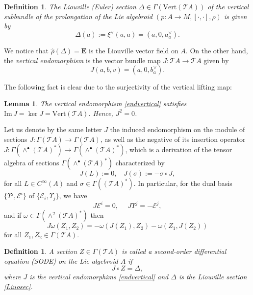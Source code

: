 \documentclass[12pt,letterpaper]{article}
\renewcommand{\hat}{\widehat}
\newtheorem{definition}[theorem]{Definition}
\newtheorem{lemma}[theorem]{Lemma}
\numberwithin{equation}{section}
\begin{document}
\begin{definition}
The \emph{Liouville (Euler) section} $\Delta\in\Gamma(\mathrm{Vert}(\mathcal{T}A))$ of the vertical subbundle
of the prolongation of the Lie algebroid $(p: A \rightarrow M, [ \cdot, \cdot ], \rho)$ is given by
\begin{equation}\label{Liuosec}
\Delta(a):=\xi^\vee(a,a)=(a,0,a^\vee_a).
\end{equation}
\end{definition}
We notice that $\hat{\rho}(\Delta)=\mathbf{E}$ is the Liouville vector field on $A$.
On the other hand, the \emph{vertical endomorphism} is the vector bundle map $J: \mathcal{T}A\rightarrow \mathcal{T}A $ given by
\begin{equation}\label{endvertical}
J(a,b,v)=(a,0,b^\vee_a).
\end{equation}

The following fact is clear due to the surjectivity of the vertical lifting map:
\begin{lemma}\label{propertiesJ}
The vertical endomorphism \eqref{endvertical} satisfies $\mathrm{Im}\, J  =\ker J = \mathrm{Vert}(\mathcal{T} A )$. Hence,  $J^2 =0$.
\end{lemma}

Let us denote by the same letter $J$ the induced endomorphism on the module of sections $J: \Gamma(\mathcal{T}A) \rightarrow \Gamma(\mathcal{T}A)$,
as well as the negative of its insertion operator $J:\Gamma(\wedge^\bullet (\mathcal{T}A)^*)\to\Gamma(\wedge^\bullet (\mathcal{T}A)^*)$,
which is a derivation of the tensor algebra of sections $\Gamma(\wedge^\bullet (\mathcal{T}A)^* ) $ characterized by
\begin{equation*}
J(L):=0, \  \  \  \ J(\sigma):=-\sigma \circ J,
\end{equation*}
for all $L\in C^\infty(A)$ and $\sigma  \in \Gamma( (\mathcal{T}A)^* )$. 
In particular, for the dual basis $\{\Upsilon^j,\mathcal{E}^i\}$ of $\{\mathcal{E}_i,\Upsilon_j\}$, we have
$$J\mathcal{E}^{i}=0 , \ \ \ \ \ \ J\Upsilon^j=-\mathcal{E}^{j},$$
and if $\omega \in \Gamma(\wedge^2 (\mathcal{T}A)^* )$  then
$$J\omega(Z_1,Z_2)=-\omega(J(Z_1),Z_2)-\omega(Z_1,J(Z_2)) $$
for all $Z_1,Z_2 \in\Gamma( \mathcal{T}A )$.

\begin{definition}
A section $Z\in \Gamma( \mathcal{T}A)$ is called a second-order differential equation (SODE) on the Lie algebroid $A$ if  
$$ J \circ Z = \Delta, $$
where $J$ is the vertical endomorphims \eqref{endvertical} and $\Delta$ is the Liouville section \eqref{Liuosec}.
\end{definition}
\end{document}
